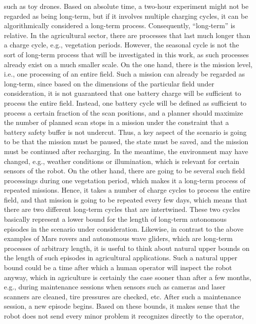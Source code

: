 \documentclass[english, master, utf8]{base/thesis_KBS}
\begin{document}
such as toy drones. Based on absolute time, a two-hour experiment might not be regarded as being long-term, but if it involves multiple charging cycles, it can be 
algorithmically considered a long-term process. Consequently, ``long-term'' is relative.\newline
In the agricultural sector, there are processes that last much longer than a charge cycle, e.g., vegetation periods.
However, the seasonal cycle is not the sort of long-term process that will be investigated in this work, as such processes already exist on a much smaller scale.
On the one hand, there is the mission level, i.e., one processing of an entire field.
Such a mission can already be regarded as long-term, since based on the dimensions of the particular field under consideration, it is not guaranteed that one
battery charge will be sufficient to process the entire field. Instead, one battery cycle will be defined as sufficient to process a certain fraction of the scan
positions, and a planner should maximize the number of planned scan stops in a mission under the constraint that a battery safety buffer is not undercut.
Thus, a key aspect of the scenario is going to be that the mission must be paused, the state must be saved, and the mission must be continued after recharging.
In the meantime, the environment may have changed, e.g., weather conditions or illumination, which is relevant for certain sensors of the robot.
On the other hand, there are going to be several such field processings during one vegetation period, which makes it a long-term process of repeated missions.
Hence, it takes a number of charge cycles to process the entire field, and that mission is going to be repeated every few days,
which means that there are two different long-term cycles that are intertwined.
These two cycles basically represent a lower bound for the length of long-term autonomous episodes in the scenario under
consideration. Likewise, in contrast to the above examples of Mars rovers and autonomous wave gliders, which are long-term
processes of arbitrary length, it is useful to think about natural upper bounds on the length of such episodes in agricultural
applications. Such a natural upper bound could be a time after which a human operator will inspect the robot anyway,
which in agriculture is certainly the case sooner than after a few months, e.g., during maintenance sessions
when sensors such as cameras and laser scanners are cleaned, tire pressures are checked, etc.
After such a maintenance session, a new episode begins.
Based on these bounds, it makes sense that the robot does not send every minor problem it recognizes directly to the operator,
\end{document}
